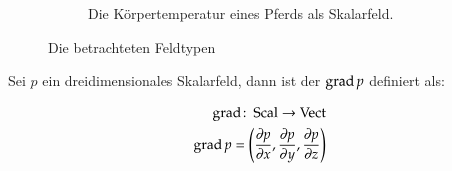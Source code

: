 \begin{figure}
\begin{subfigure}[t]{0.5\textwidth}
		\caption{Die Körpertemperatur eines Pferds als Skalarfeld.}
		\label{fig:mathematics_scalarfield}
	\end{subfigure}
	\caption{Die betrachteten Feldtypen}
\end{figure}

Sei $p$ ein dreidimensionales Skalarfeld, dann ist der 
$\operatorname*{grad} p$ definiert als:

\begin{equation}
\begin{aligned}
\operatorname*{grad} \colon \operatorname*{Scal} \to \operatorname*{Vect} \\
\operatorname*{grad} p
=
\left( \frac{\partial p}{\partial x},\frac{\partial p}{\partial y},\frac{\partial p}{\partial z} \right)
\end{aligned}
\end{equation}

